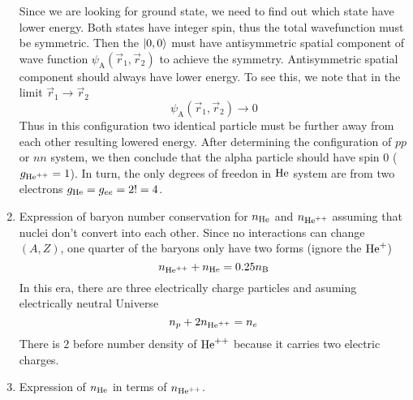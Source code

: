 \begin{enumerate}[label=(\alph*)]
      Since we are looking for ground state, we need to find out which state have lower energy. Both states have integer spin, thus the total wavefunction must be symmetric. Then the $\ket{0, 0}$ must have antisymmetric spatial component of wave function $\psi_\text{A}(\vec{r}_1, \vec{r}_2)$ to achieve the symmetry. Antisymmetric spatial component should always have lower energy. To see this, we note that in the limit $\vec{r}_1 \rightarrow \vec{r}_2$
      \begin{equation*}
         \psi_\text{A}(\vec{r}_1, \vec{r}_2) \rightarrow 0
      \end{equation*}
      Thus in this configuration two identical particle must be further away from each other resulting lowered energy. After determining the configuration of $pp$ or $nn$ system, we then conclude that the alpha particle should have spin $0$ ($g_{\text{He}^{++}} = 1$). In turn, the only degrees of freedon in $\text{He}$ system are from two electrons $g_{\text{He}} = g_{ee} = 2! = 4$.

   \item Expression of baryon number conservation for $n_{\text{He}}$ and $n_{\text{He}^{++}}$ assuming that nuclei don't convert into each other. Since no interactions can change $(A,Z)$, one quarter of the baryons only have two forms (ignore the $\text{He}^+$)
      \begin{equation}
         n_{\text{He}^{++}} + n_{\text{He}} = 0.25 n_\text{B} \label{math:bcons}
      \end{equation}
      In this era, there are three electrically charge particles and asuming electrically neutral Universe
      \begin{equation}
         n_p + 2 n_{{\text{He}^{++}}} = n_e \label{math:neutral}
      \end{equation}
      There is $2$ before number density of ${\text{He}^{++}}$ because it carries two electric charges.
   \item Expression of $n_{\text{He}}$ in terms of $n_{{\text{He}^{++}}}$. 


\end{enumerate}
